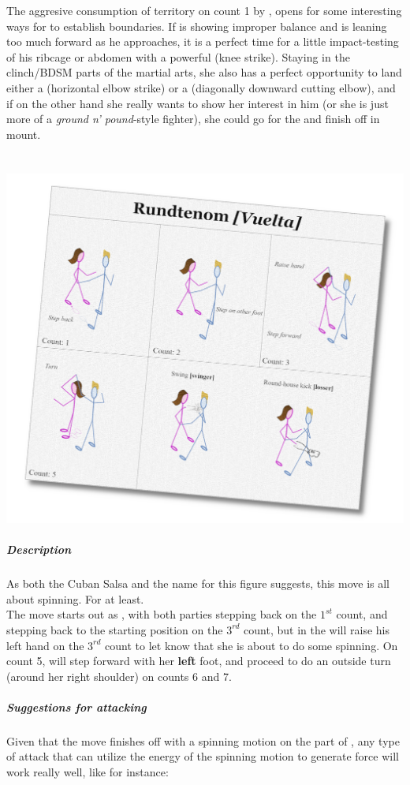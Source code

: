 The  aggresive consumption of territory on count 1 by \dude , opens for some interesting ways for \gal to establish boundaries. If \dude is showing improper balance and is leaning too much forward as he approaches, it is a perfect time for a little impact-testing of his ribcage or abdomen with a powerful \attkneeler (knee strike). Staying in the clinch/BDSM parts of the martial arts, she also has a perfect opportunity to land either a \attrambuk (horizontal elbow strike) or a \attsuperman (diagonally downward cutting elbow), and if on the other hand she really wants to show her interest in him (or she is just more of a \textit{ground n' pound}-style fighter), she could go for the \atttakedown and finish off in mount. 

\pagebreak{}
\section*{\Sovsvuelta [\Salsavuelta]}
\begin{center}
\includegraphics[scale=0.15]{02-Description/diagram-vuelta-present}
\end{center}
\subparagraph*{Description}
As both the Cuban Salsa and the \sovs name for this figure suggests, this move is all about spinning. For \gal at least.\\
The move starts out as \sovsguapea, with both parties stepping back on the $1^{st}$ count, and stepping back to the starting position on the $3^{rd}$ count, but in the \sovsvuelta \dude will raise his left hand on the $3^{rd}$ count to let \gal know that she is about to do some spinning. On count 5, \gal will step forward with her \textbf{left} foot, and proceed to do an outside turn (around her right shoulder)  on counts 6 and 7. 
\subparagraph*{Suggestions for attacking}
Given that the move finishes off with a spinning motion on the part of \gal, any type of attack that can utilize the energy of the spinning motion to generate force will work really well, like for instance:

